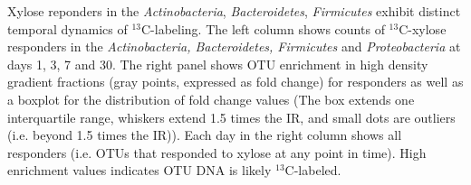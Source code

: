 Xylose reponders in the \textit{Actinobacteria}, \textit{Bacteroidetes},
\textit{Firmicutes} exhibit distinct temporal dynamics of $^{13}$C-labeling.
The left column shows counts of $^{13}$C-xylose responders in the
\textit{Actinobacteria, Bacteroidetes, Firmicutes} and \textit{Proteobacteria}
at days 1, 3, 7 and 30. The right panel shows OTU enrichment in high density
gradient fractions (gray points, expressed as fold change) for responders
as well as a boxplot for the distribution of fold change values
(The box extends one interquartile range, whiskers extend 1.5 times
the IR, and small dots are outliers (i.e. beyond 1.5 times the IR)).
Each day in the right column shows all responders (i.e.
OTUs that responded to xylose at any point in time). High enrichment values 
indicates OTU DNA is likely $^{13}$C-labeled.
    
